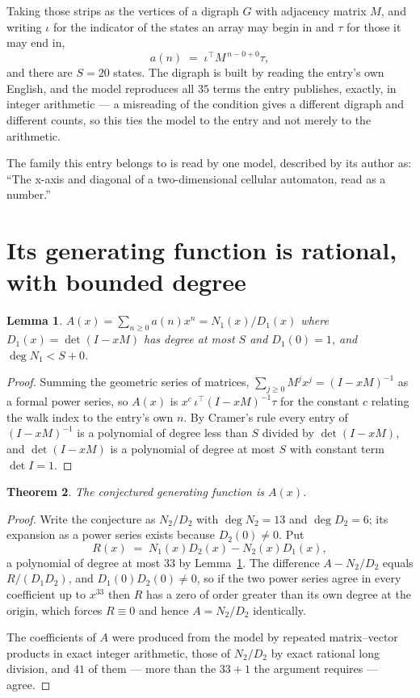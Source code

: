 \documentclass[11pt,a4paper]{article}
\theoremstyle{plain}
\newtheorem{theorem}{Theorem}
\newtheorem{lemma}[theorem]{Lemma}
\theoremstyle{definition}
\begin{document}
Taking those strips as the vertices of a digraph $G$ with adjacency matrix $M$, and writing
$\iota$ for the indicator of the states an array may begin in and $\tau$ for those it may end
in,
\[
a(n)\;=\;\iota^{\!\top}M^{\,n-0+0}\tau ,
\]
and there are $S=20$ states. The digraph is built by reading the entry's own English, and the
model reproduces all $35$ terms the entry publishes, exactly, in integer arithmetic --- a
misreading of the condition gives a different digraph and different counts, so this ties the
model to the entry and not merely to the arithmetic.

The family this entry belongs to is read by one model, described by its author as: ``The x-axis and diagonal of a two-dimensional cellular automaton, read as a number.''


\section{Its generating function is rational, with bounded degree}

\begin{lemma}\label{lem:rat}
$A(x)=\sum_{n\ge0}a(n)x^n=N_1(x)/D_1(x)$ where $D_1(x)=\det(I-xM)$ has degree at most
$S$ and $D_1(0)=1$, and $\deg N_1<S+0$.
\end{lemma}

\begin{proof}
Summing the geometric series of matrices, $\sum_{j\ge0}M^jx^j=(I-xM)^{-1}$ as a formal
power series, so $A(x)$ is $x^{c}\,\iota^{\!\top}(I-xM)^{-1}\tau$ for the constant $c$
relating the walk index to the entry's own $n$. By Cramer's rule every entry of
$(I-xM)^{-1}$ is a polynomial of degree less than $S$ divided by $\det(I-xM)$, and
$\det(I-xM)$ is a polynomial of degree at most $S$ with constant term $\det I=1$.
\end{proof}

\begin{theorem}
The conjectured generating function is $A(x)$.
\end{theorem}

\begin{proof}
Write the conjecture as $N_2/D_2$ with $\deg N_2=13$ and $\deg D_2=6$; its expansion as a
power series exists because $D_2(0)\neq0$. Put
\[
R(x)\;=\;N_1(x)D_2(x)-N_2(x)D_1(x),
\]
a polynomial of degree at most $33$ by Lemma~\ref{lem:rat}. The difference
$A-N_2/D_2$ equals $R/(D_1D_2)$, and $D_1(0)D_2(0)\neq0$, so if the two power series agree in
every coefficient up to $x^{33}$ then $R$ has a zero of order greater than its own
degree at the origin, which forces $R\equiv0$ and hence $A=N_2/D_2$ identically.

The coefficients of $A$ were produced from the model by repeated matrix--vector products in
exact integer arithmetic, those of $N_2/D_2$ by exact rational long division, and $41$
of them --- more than the $33+1$ the argument requires --- agree.
\end{proof}
\end{document}
